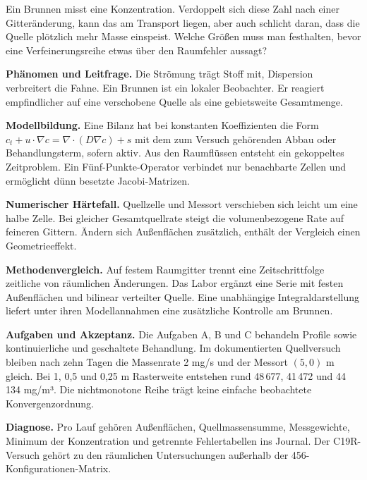 Ein Brunnen misst eine Konzentration. Verdoppelt sich diese Zahl nach einer Gitteränderung, kann das am Transport liegen, aber auch schlicht daran, dass die Quelle plötzlich mehr Masse einspeist. Welche Größen muss man festhalten, bevor eine Verfeinerungsreihe etwas über den Raumfehler aussagt?
\par\textsf{\bfseries\color{sea}Phänomen und Leitfrage.} Die Strömung trägt Stoff mit, Dispersion verbreitert die Fahne. Ein Brunnen ist ein lokaler Beobachter. Er reagiert empfindlicher auf eine verschobene Quelle als eine gebietsweite Gesamtmenge.
\par\textsf{\bfseries\color{sea}Modellbildung.} Eine Bilanz hat bei konstanten Koeffizienten die Form \(c_t+u\cdot\nabla c=\nabla\cdot(D\nabla c)+s\) mit dem zum Versuch gehörenden Abbau oder Behandlungsterm, sofern aktiv. Aus den Raumflüssen entsteht ein gekoppeltes Zeitproblem. Ein Fünf-Punkte-Operator verbindet nur benachbarte Zellen und ermöglicht dünn besetzte Jacobi-Matrizen.
\par\textsf{\bfseries\color{sea}Numerischer Härtefall.} Quellzelle und Messort verschieben sich leicht um eine halbe Zelle. Bei gleicher Gesamtquellrate steigt die volumenbezogene Rate auf feineren Gittern. Ändern sich Außenflächen zusätzlich, enthält der Vergleich einen Geometrieeffekt.
\par\textsf{\bfseries\color{sea}Methodenvergleich.} Auf festem Raumgitter trennt eine Zeitschrittfolge zeitliche von räumlichen Änderungen. Das Labor ergänzt eine Serie mit festen Außenflächen und bilinear verteilter Quelle. Eine unabhängige Integraldarstellung liefert unter ihren Modellannahmen eine zusätzliche Kontrolle am Brunnen.
\par\textsf{\bfseries\color{sea}Aufgaben und Akzeptanz.} Die Aufgaben A, B und C behandeln Profile sowie kontinuierliche und geschaltete Behandlung. Im dokumentierten Quellversuch bleiben nach zehn Tagen die Massenrate 2 mg/s und der Messort \((5,0)\) m gleich. Bei 1, 0,5 und 0,25 m Rasterweite entstehen rund 48\,677, 41\,472 und 44\,134 mg/m³. Die nichtmonotone Reihe trägt keine einfache beobachtete Konvergenzordnung.
\par\textsf{\bfseries\color{sea}Diagnose.} Pro Lauf gehören Außenflächen, Quellmassensumme, Messgewichte, Minimum der Konzentration und getrennte Fehlertabellen ins Journal. Der C19R-Versuch gehört zu den räumlichen Untersuchungen außerhalb der 456-Konfigurationen-Matrix.


